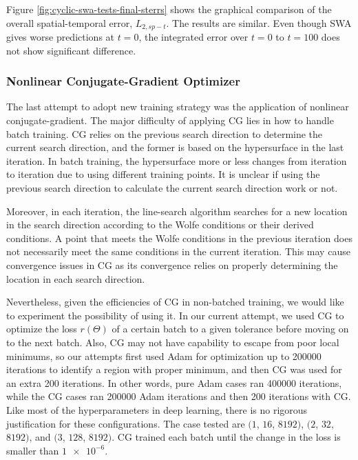 Figure \ref{fig:cyclic-swa-tests-final-sterrs} shows the graphical comparison of the overall spatial-temporal error, $L_{2,sp-t}$.
The results are similar.
Even though SWA gives worse predictions at $t=0$, the integrated error over $t=0$ to $t=100$ does not show significant difference.

\subsubsection{Nonlinear Conjugate-Gradient Optimizer}
\label{sec:ncg-tests}

The last attempt to adopt new training strategy was the application of nonlinear conjugate-gradient.
The major difficulty of applying CG lies in how to handle batch training.
CG relies on the previous search direction to determine the current search direction, and the former is based on the hypersurface in the last iteration.
In batch training, the hypersurface more or less changes from iteration to iteration due to using different training points.
It is unclear if using the previous search direction to calculate the current search direction work or not.

Moreover, in each iteration, the line-search algorithm searches for a new location in the search direction according to the Wolfe conditions or their derived conditions.
A point that meets the Wolfe conditions in the previous iteration does not necessarily meet the same conditions in the current iteration.
This may cause convergence issues in CG as its convergence relies on properly determining the location in each search direction.

Nevertheless, given the efficiencies of CG in non-batched training, we would like to experiment the possibility of using it.
In our current attempt, we used CG to optimize the loss $r(\Theta)$ of a certain batch to a given tolerance before moving on to the next batch.
Also, CG may not have capability to escape from poor local minimums, so our attempts first used Adam for optimization up to \num{200000} iterations to identify a region with proper minimum, and then CG was used for an extra 200 iterations.
In other words, pure Adam cases ran \num{400000} iterations, while the CG cases ran \num{200000} Adam iterations and then \num{200} iterations with CG.
Like most of the hyperparameters in deep learning, there is no rigorous justification for these configurations.
The case tested are $(1$, $16$, $8192)$, $(2$, $32$, $8192)$, and $(3$, $128$, $8192)$.
CG trained each batch until the change in the loss is smaller than $\num{1e-6}$.

